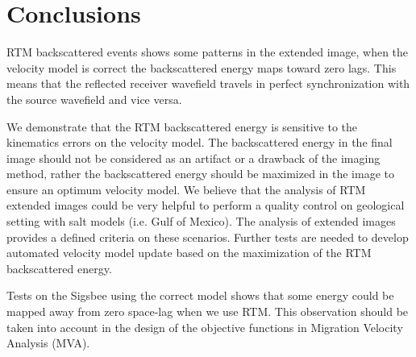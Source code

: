 \section{Conclusions}

RTM backscattered events shows some patterns in the extended image, when the velocity
model is correct the backscattered energy maps toward zero lags. This means that the reflected
receiver wavefield travels in perfect synchronization with the source wavefield and
vice versa.

We demonstrate that the RTM backscattered energy is sensitive to the kinematics errors
on the velocity model. The backscattered energy in the final image should not be considered 
as an artifact or a drawback of the imaging method, rather the backscattered energy
 should be maximized in the image to ensure an optimum velocity 
model. We believe that the analysis of RTM extended images could be very helpful to 
perform a quality control on geological setting with salt models (i.e. Gulf of Mexico). The analysis
of extended images provides a defined criteria on these scenarios.
 Further tests are needed to develop automated velocity model update based on the maximization of 
the RTM backscattered energy.

Tests on the Sigsbee using the correct model shows that some energy could be mapped away from zero space-lag when
we use RTM. This observation should be taken into account in the design of the objective 
functions in Migration Velocity Analysis (MVA).
